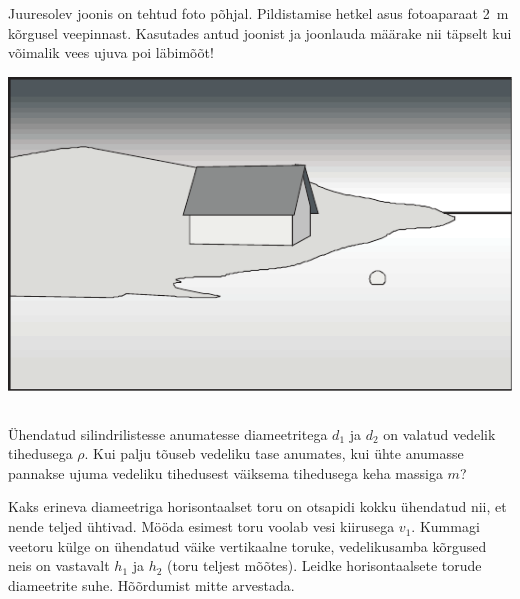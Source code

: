 \documentclass[10pt]{article}
\begin{document}
{%

Juuresolev joonis on tehtud foto põhjal. Pildistamise hetkel asus fotoaparaat \SI{2}{m} kõrgusel veepinnast. Kasutades antud joonist ja joonlauda määrake nii täpselt kui võimalik vees ujuva poi läbimõõt!

\begin{center}
	\includegraphics[width=0.9\linewidth]{2008-lahg-09-yl}
\end{center}
\probend
\bigskip
\newpage\subsection{\protect{}}


Ühendatud silindrilistesse anumatesse diameetritega $d_1$ ja $d_2$ on valatud vedelik tihedusega $\rho$. Kui palju tõuseb vedeliku tase anumates, kui ühte anumasse pannakse ujuma vedeliku tihedusest väiksema tihedusega keha massiga $m$?
\probend
\bigskip


Kaks erineva diameetriga horisontaalset toru on otsapidi
kokku ühendatud nii, et nende teljed ühtivad. Mööda esimest toru voolab vesi
kiirusega $v_1$. Kummagi veetoru külge on ühendatud väike vertikaalne toruke,
vedelikusamba kõrgused neis on vastavalt $h_1$ ja $h_2$ (toru teljest mõõtes). Leidke
horisontaalsete torude diameetrite suhe. Hõõrdumist mitte arvestada. 

}
\end{document}
